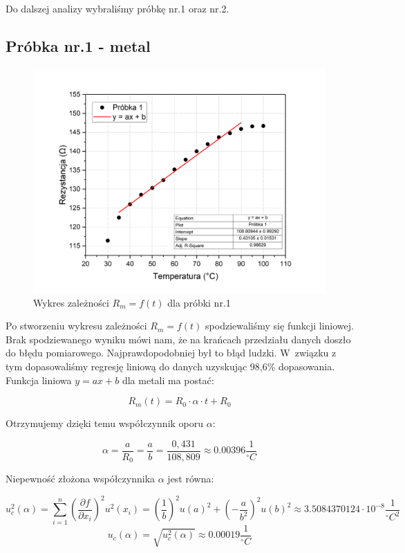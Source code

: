 Do dalszej analizy wybraliśmy próbkę nr.1 oraz nr.2.

\newpage
\subsection{Próbka nr.1 - metal}

\begin{figure}[!ht]
    \centering
    \includegraphics[width = 150mm]{imgs/Graph1.png}
    \caption{Wykres zależności $R_m = f(t)$ dla próbki nr.1}
    \label{fig:metal}
\end{figure}

Po stworzeniu wykresu zależności $R_m = f(t)$ spodziewaliśmy się funkcji liniowej.
Brak spodziewanego wyniku mówi nam, że na krańcach przedziału danych doszło do błędu pomiarowego. Najprawdopodobniej był to błąd ludzki.
W związku z tym dopasowaliśmy regresję liniową do danych uzyskując 98,6\% dopasowania. \\

Funkcja liniowa $y = ax + b$ dla metali ma postać:

$$R_m(t) = R_0 \cdot \alpha \cdot t + R_0$$

Otrzymujemy dzięki temu współczynnik oporu $\alpha$:

$$\alpha = \frac{a}{R_0} = \frac{a}{b} = \frac{0,431}{108,809} \approx 0.00396 \frac{1}{^{\circ}C}$$

Niepewność złożona współczynnika $\alpha$ jest równa:

$$u_c^2(\alpha) = \displaystyle\sum_{i=1}^{n} \left( \frac{\partial f}{\partial x_i} \right)^2 u^2(x_i)  = \left( \frac{1}{b} \right)^2 u(a)^2 + \left( -\frac{a}{b^2} \right)^2 u(b)^2 \approx 3.5084370124 \cdot 10^{-8} \frac{1}{^{\circ}C^2}$$
$$u_c(\alpha) = \sqrt{u_c^2(\alpha)} \approx 0.00019 \frac{1}{^{\circ}C}$$

